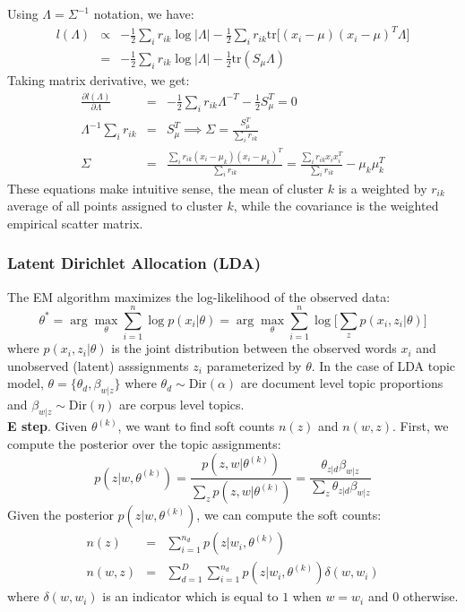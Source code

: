 Using $\Lambda = \Sigma^{-1}$ notation, we have:
\begin{eqnarray}
    l(\Lambda) &\propto& -\frac{1}{2}\sum_i r_{ik} \log|\Lambda| - \frac{1}{2}\sum_i r_{ik} \mathrm{tr}\bigg[(x_i-\mu)(x_i-\mu)^{T}\Lambda\bigg] \nonumber \\ 
    &=& -\frac{1}{2}\sum_i r_{ik} \log|\Lambda| - \frac{1}{2}\mathrm{tr}(S_{\mu}\Lambda) 
\end{eqnarray}
Taking matrix derivative, we get:
\begin{eqnarray}
    \frac{\partial l(\Lambda)}{\partial \Lambda} &=& -\frac{1}{2}\sum_i r_{ik} \Lambda^{-T} - \frac{1}{2}S_{\mu}^{T} = 0 \nonumber \\
    \Lambda^{-1}\sum_i r_{ik} &=& S_{\mu}^{T} \implies \Sigma = \frac{S_{\mu}^{T}}{\sum_i r_{ik}} \nonumber \\
    \Sigma &=& \frac{\sum_i r_{ik} (x_i - \mu_k)(x_i - \mu_k)^{T}}{\sum_i r_{ik}} = \frac{\sum_i r_{ik}x_i x_{i}^{T}}{\sum_i r_{ik}} - \mu_k \mu_{k}^{T}
\end{eqnarray}
These equations make intuitive sense, the mean of cluster $k$ is a weighted by $r_{ik}$ average of all points assigned to cluster $k$, while the covariance is the weighted empirical scatter matrix. 

\subsubsection{Latent Dirichlet Allocation (LDA)}

The EM algorithm maximizes the log-likelihood of the observed data:
\begin{equation}
   \theta^{\ast} = \arg \max_{\theta} \sum_{i=1}^{n} \log p(x_i|\theta) = \arg \max_{\theta} \sum_{i=1}^{n} \log \big[\sum_z p(x_i,z_i|\theta) \big]
\end{equation}
where $p(x_i, z_i|\theta)$ is the joint distribution between the observed words $x_i$ and unobserved (latent) asssignments $z_i$ parameterized by $\theta$. In the case of LDA topic model, $\theta = \{\theta_d, \beta_{w|z}\}$ where $\theta_d \sim \mathrm{Dir}(\alpha)$ are document level topic proportions and $\beta_{w|z} \sim \mathrm{Dir}(\eta)$ are corpus level topics.\\

\textbf{E step}. Given $\theta^{(k)}$, we want to find soft counts $n(z)$ and $n(w,z)$. First, we compute the posterior over the topic assignments:
\begin{equation}
    p(z|w, \theta^{(k)}) = \frac{p(z,w|\theta^{(k)})}{\sum_z p(z,w|\theta^{(k)})} = \frac{\theta_{z|d}\beta_{w|z}}{\sum_z \theta_{z|d}\beta_{w|z}}
\end{equation}
Given the posterior $p(z|w,\theta^{(k)})$, we can compute the soft counts:
\begin{eqnarray}
    n(z)   &=& \sum_{i=1}^{n_d} p(z|w_i,\theta^{(k)}) \\
    n(w,z) &=& \sum_{d=1}^{D}\sum_{i=1}^{n_d} p(z|w_i,\theta^{(k)})\delta(w, w_i) 
\end{eqnarray}
where $\delta(w, w_i)$ is an indicator which is equal to $1$ when $w=w_i$ and $0$ otherwise.

